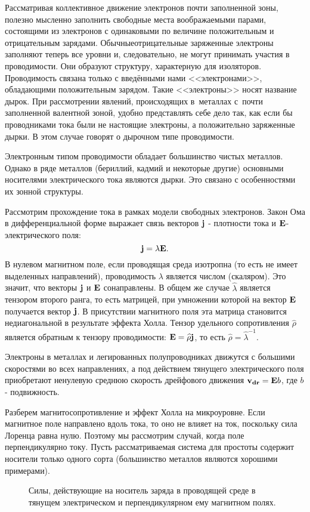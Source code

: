 Рассматривая коллективное движение электронов почти заполненной зоны, полезно мысленно заполнить свободные места
воображаемыми парами, состоящими из электронов с одинаковыми по величине положительным и отрицательным зарядами. Обычныеотрицательные заряженные электроны заполняют теперь все уровни и, следовательно, не могут принимать участия в проводимости. Они образуют структуру, характерную для изоляторов. Проводимость связана только с введёнными нами
<<электронами>>, обладающими положительным зарядом. Такие <<электроны>> носят название \textsf{дырок}. При рассмотрении явлений, происходящих в~металлах с~почти заполненной валентной зоной, удобно представлять себе дело так, как если бы проводниками тока были не настоящие электроны, а положительно заряженные дырки. В этом случае говорят о \textsf{дырочном типе проводимости}.

Электронным типом проводимости обладает большинство чистых металлов. Однако в ряде металлов (бериллий, кадмий и
некоторые другие) основными носителями электрического тока являются дырки. Это связано с особенностями их зонной
структуры.

Рассмотрим прохождение тока в рамках модели свободных электронов.
Закон Ома в дифференциальной форме выражает связь векторов ${\bf j}$ - плотности тока и ${\bf E}$- электрического поля:
\begin{equation}
{\bf j}=\lambda {\bf E}.
\end{equation}
 В нулевом магнитном поле, если проводящая среда изотропна (то есть не имеет выделенных направлений), проводимость $\lambda$ является числом (скаляром). Это значит, что векторы ${\bf j}$ и ${\bf E}$ сонаправлены. В общем же случае $\widehat{\lambda}$ является тензором второго ранга, то есть матрицей, при умножении которой на вектор ${\bf E}$ получается вектор ${\bf j}$. В присутствии магнитного поля эта матрица становится недиагональной в результате эффекта Холла. Тензор удельного сопротивления $\widehat{\rho}$ является обратным к тензору проводимости: ${\bf E}=\widehat{\rho} {\bf j}$, то есть $\widehat{\rho}=\widehat{\lambda}^{-1}$.

Электроны в металлах и легированных полупроводниках движутся с большими скоростями во всех направлениях, а под действием тянущего
электрического поля приобретают ненулевую среднюю скорость дрейфового движения ${\bf v_{dr}}= {\bf E}b$, где $b$ - подвижность.

Разберем магнитосопротивление и эффект Холла на микроуровне. Если магнитное поле направлено вдоль тока, то
оно не влияет на ток, поскольку сила Лоренца равна нулю. Поэтому мы рассмотрим случай, когда поле перпендикулярно
току. Пусть рассматриваемая система для простоты содержит носители только одного сорта (большинство металлов
являются хорошими примерами).
\begin{figure}
	\caption{Силы, действующие на носитель заряда в проводящей среде в тянущем электрическом и перпендикулярном ему магнитном полях.}
	\label{fig1}
\end{figure}

